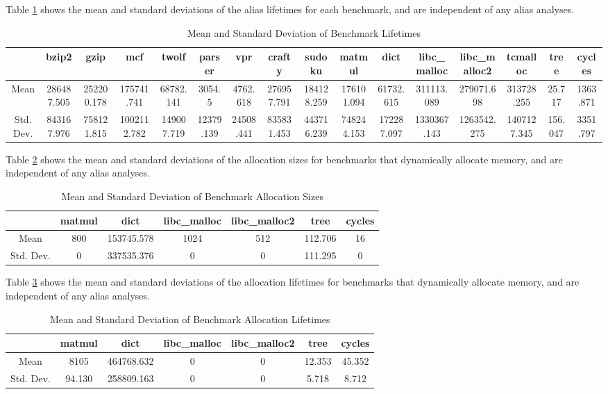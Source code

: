 Table \ref{table:5} shows the mean and standard deviations of the alias lifetimes for each benchmark, and are independent of any alias analyses.

\begin{table} [h!]
\centering
   \begin{tabular} {|c|c c c c c c c c c c c c c c c|}
      \hline
      & bzip2 & gzip & mcf & twolf & parser & vpr & crafty & sudoku & matmul & dict & libc\_malloc & libc\_malloc2 & tcmalloc & tree & cycles \\
      \hline
      Mean & 286487.505 & 252200.178 & 175741.741 & 68782.141 & 3054.5 & 4762.618 & 276957.791 & 184128.259 & 176101.094 & 61732.615 & 311113.089 & 279071.698 & 313728.255 & 25.717 & 1363.871 \\
      \hline
      Std. Dev. & 843167.976 & 758121.815 & 1002112.782 & 149007.719 & 12379.139 & 24508.441 & 835831.453 & 443716.239 & 748244.153 & 172287.097 & 1330367.143 & 1263542.275 & 1407127.345 & 156.047 & 3351.797 \\
      \hline
   \end{tabular}
   \caption{Mean and Standard Deviation of Benchmark Lifetimes}
   \label{table:5}
\end{table}

Table \ref{table:6} shows the mean and standard deviations of the allocation sizes for benchmarks that dynamically allocate memory, and are independent of any alias analyses.

\begin{table} [h!]
\centering
   \begin{tabular} {|c|c c c c c c|}
      \hline
      & matmul & dict & libc\_malloc & libc\_malloc2 & tree & cycles \\
      \hline
      Mean & 800 & 153745.578 & 1024 & 512 & 112.706 & 16 \\
      \hline
      Std. Dev. & 0 & 337535.376 & 0 & 0 & 111.295 & 0 \\
      \hline
   \end{tabular}
   \caption{Mean and Standard Deviation of Benchmark Allocation Sizes}
   \label{table:6}
\end{table}

Table \ref{table:7} shows the mean and standard deviations of the allocation lifetimes for benchmarks that dynamically allocate memory, and are independent of any alias analyses.

\begin{table} [h!]
\centering
   \begin{tabular} {|c|c c c c c c|}
      \hline
      & matmul & dict & libc\_malloc & libc\_malloc2 & tree & cycles \\
      \hline
      Mean & 8105 & 464768.632 & 0 & 0 & 12.353 & 45.352 \\
      \hline
      Std. Dev. & 94.130 & 258809.163 & 0 & 0 & 5.718 & 8.712 \\
      \hline
   \end{tabular}
   \caption{Mean and Standard Deviation of Benchmark Allocation Lifetimes}
   \label{table:7}
\end{table}
